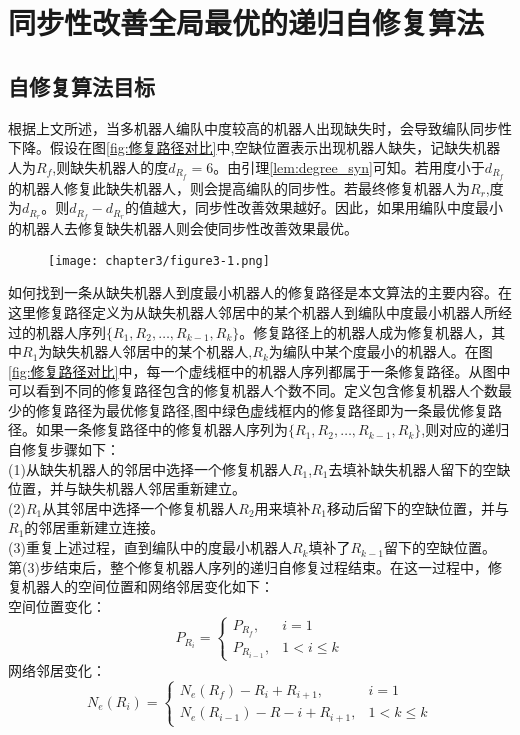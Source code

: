 
\chapter{同步性改善全局最优的递归自修复算法}

\section{自修复算法目标}
根据上文所述，当多机器人编队中度较高的机器人出现缺失时，会导致编队同步性下降。假设在图\ref{fig:修复路径对比}中,空缺位置表示出现机器人缺失，记缺失机器人为$R_f$,则缺失机器人的度$d_{R_f} = 6$。由引理\ref{lem:degree_syn}可知。若用度小于$d_{R_f}$的机器人修复此缺失机器人，则会提高编队的同步性。若最终修复机器人为$R_r$,度为$d_{R_r}$。则$d_{R_f}-d_{R_r}$的值越大，同步性改善效果越好。因此，如果用编队中度最小的机器人去修复缺失机器人则会使同步性改善效果最优。
\begin{figure}[!htbp]
	\centering
	\texttt{[image: chapter3/figure3-1.png]}
\end{figure}

如何找到一条从缺失机器人到度最小机器人的修复路径是本文算法的主要内容。在这里修复路径定义为从缺失机器人邻居中的某个机器人到编队中度最小机器人所经过的机器人序列$\{R_1,R_2,\dots,R_{k-1},R_k\}$。修复路径上的机器人成为修复机器人，其中$R_1$为缺失机器人邻居中的某个机器人,$R_k$为编队中某个度最小的机器人。在图\ref{fig:修复路径对比}中，每一个虚线框中的机器人序列都属于一条修复路径。从图中可以看到不同的修复路径包含的修复机器人个数不同。定义包含修复机器人个数最少的修复路径为最优修复路径,图中绿色虚线框内的修复路径即为一条最优修复路径。如果一条修复路径中的修复机器人序列为$\{R_1,R_2,\dots,R_{k-1},R_k\}$,则对应的递归自修复步骤如下：\\
\indent (1)从缺失机器人的邻居中选择一个修复机器人$R_1$,$R_1$去填补缺失机器人留下的空缺位置，并与缺失机器人邻居重新建立。\\
\indent (2)$R_1$从其邻居中选择一个修复机器人$R_2$用来填补$R_1$移动后留下的空缺位置，并与$R_1$的邻居重新建立连接。\\
\indent (3)重复上述过程，直到编队中的度最小机器人$R_k$填补了$R_{k-1}$留下的空缺位置。\\
第(3)步结束后，整个修复机器人序列的递归自修复过程结束。在这一过程中，修复机器人的空间位置和网络邻居变化如下：\\
空间位置变化：\\
\begin{equation}
	P_{R_i} = 
	\begin{cases}
		P_{R_f}, & i=1 \\
		P_{R_{i-1}}, & 1 < i \leq k
	\end{cases}
\end{equation}
网络邻居变化：\\
\begin{equation}
	N_e(R_i) = 
	\begin{cases}
		N_e(R_f) - R_i + R_{i+1}, & i = 1 \\
		N_e(R_{i-1}) - R-i + R_{i+1}, & 1<k \leq k
	\end{cases}
\end{equation}

